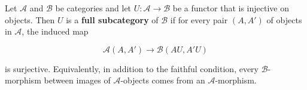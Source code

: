 Let $\mathcal{A}$ and $\mathcal{B}$ be categories and let $U: \mathcal{A} \to \mathcal{B}$ be a functor that is injective on objects. Then $U$ is a \textbf{full subcategory} of $\mathcal{B}$ if for every pair $(A, A')$ of objects in $\mathcal{A}$, the induced map

$$\mathcal{A}(A, A') \longrightarrow \mathcal{B}(AU, A'U)$$

is surjective. Equivalently, in addition to the faithful condition, every $\mathcal{B}$-morphism between images of $\mathcal{A}$-objects comes from an $\mathcal{A}$-morphism.
